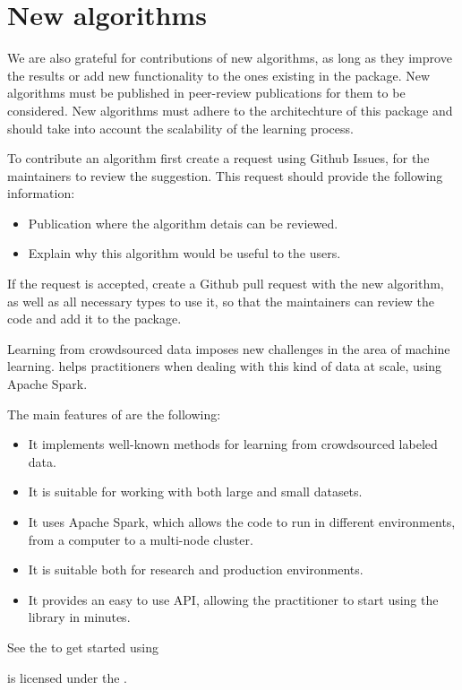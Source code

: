 \documentclass[letterpaper,10pt,english]{sphinxmanual}
\begin{document}
\section{New algorithms}
\label{\detokenize{package/contributors:new-algorithms}}
We are also grateful for contributions of new algorithms, as long as they improve the results or add new functionality to the ones existing in the package.
New algorithms must be published in peer-review publications for them to be considered. New algorithms must adhere to the architechture of this package and
should take into account the scalability of the learning process.

To contribute an algorithm first create a request using Github Issues, for the maintainers to review the suggestion. This request should provide the following information:
\begin{itemize}
\item {} 
Publication where the algorithm detais can be reviewed.

\item {} 
Explain why this algorithm would be useful to the users.

\end{itemize}

If the request is accepted, create a Github pull request with the new algorithm, as well as all necessary types to use it, so that the maintainers can review the
code and add it to the package.

Learning from crowdsourced data imposes new challenges
in the area of machine learning.  helps practitioners
when dealing with this kind of data at scale, using Apache Spark.

\noindent{}

The main features of  are the following:
\begin{itemize}
\item {} 
It implements well-known methods for learning from crowdsourced labeled data.

\item {} 
It is suitable for working with both large and small datasets.

\item {} 
It uses Apache Spark, which allows the code to run in different environments, from a computer to a multi-node cluster.

\item {} 
It is suitable both for research and production environments.

\item {} 
It provides an easy to use API, allowing the practitioner to start using the library in minutes.

\end{itemize}

See the {\hyperref[\detokenize{usage/quickstart:quickstart}]{}} to get started using 

 is licensed under the .



\renewcommand{\indexname}{Index}
\printindex
\end{document}

